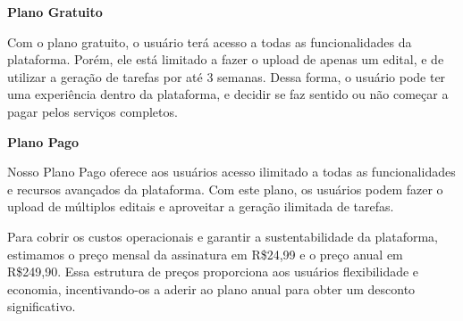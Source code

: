\textbf{Plano Gratuito}

Com o plano gratuito, o usuário terá acesso a todas as funcionalidades da plataforma. Porém, ele está limitado a fazer o upload de apenas um edital, e de utilizar a geração de tarefas por até 3 semanas. Dessa forma, o usuário pode ter uma experiência dentro da plataforma, e decidir se faz sentido ou não começar a pagar pelos serviços completos.

\textbf{Plano Pago}

Nosso Plano Pago oferece aos usuários acesso ilimitado a todas as funcionalidades e recursos avançados da plataforma. Com este plano, os usuários podem fazer o upload de múltiplos editais e aproveitar a geração ilimitada de tarefas.

Para cobrir os custos operacionais e garantir a sustentabilidade da plataforma, estimamos o preço mensal da assinatura em R\$24,99 e o preço anual em R\$249,90. Essa estrutura de preços proporciona aos usuários flexibilidade e economia, incentivando-os a aderir ao plano anual para obter um desconto significativo.